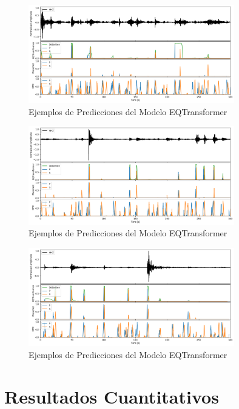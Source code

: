 \begin{figure}
\centering
\includegraphics[width=0.8\textwidth]{figures/testing/image9.png}
\caption{Ejemplos de Predicciones del Modelo EQTransformer}
\label{fig:predicciones}
\end{figure}

\begin{figure}
\centering
\includegraphics[width=0.8\textwidth]{figures/testing/image10.png}
\caption{Ejemplos de Predicciones del Modelo EQTransformer}
\label{fig:predicciones}
\end{figure}

\begin{figure}
\centering
\includegraphics[width=0.8\textwidth]{figures/testing/image11.png}
\caption{Ejemplos de Predicciones del Modelo EQTransformer}
\label{fig:predicciones}
\end{figure}

\section{Resultados Cuantitativos}

